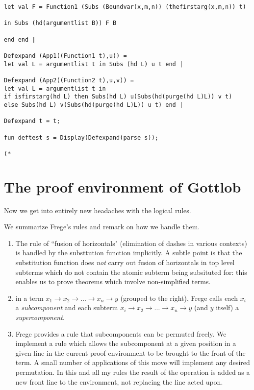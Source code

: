 \documentclass{article}
\begin{document}
{{\begin{verbatim}
let val F = Function1 (Subs (Boundvar(x,m,n)) (thefirstarg(x,m,n)) t)

in Subs (hd(argumentlist B)) F B

end end |

Defexpand (App1((Function1 t),u)) =
let val L = argumentlist t in Subs (hd L) u t end |

Defexpand (App2((Function2 t),u,v)) =
let val L = argumentlist t in
if isfirstarg(hd L) then Subs(hd L) u(Subs(hd(purge(hd L)L)) v t)
else Subs(hd L) v(Subs(hd(purge(hd L)L)) u t) end |

Defexpand t = t;

fun deftest s = Display(Defexpand(parse s));

(*

\end{verbatim}

\newpage

\section{The proof environment of Gottlob}

Now we get into entirely new headaches with the logical rules.

We summarize Frege's rules and remark on how we handle them.

\begin{enumerate}

\item  The rule of ``fusion of horizontals" (elimination of dashes in various contexts) is handled by the substtution function implicitly.  A subtle point is that the substitution function
does {\em not\/} carry out fusion of horizontals in top level subterms which do not contain the atomic subterm being subsituted for:  this enables us to prove theorems which involve non-simplified terms.

\item  in a term $x_1 \rightarrow x_2 \rightarrow \ldots \rightarrow x_n \rightarrow y$ (grouped to the right), Frege calls each $x_i$ a {\em subcomponent\/} and each subterm
$x_i \rightarrow x_2 \rightarrow \ldots \rightarrow x_n \rightarrow y$  (and $y$ itself) a {\em supercomponent\/}.

\item Frege provides a rule that subcomponents can be permuted freely.  We implement a rule which allows the subcomponent at a given position in a given line in the current proof environment to be brought to the front of the term.  A small number of applications of this move will implement any desired permutation.  In this and all my rules the result of the operation is added as a new front line to the environment, not replacing the line acted upon.


\end{enumerate}}}
\end{document}

